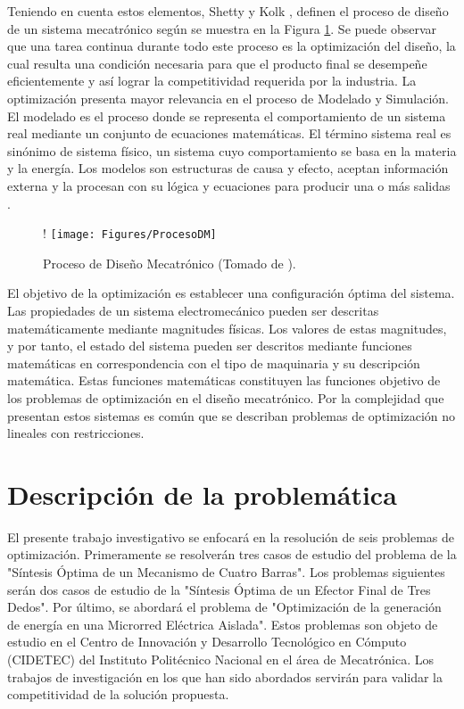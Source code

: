  Teniendo en cuenta estos elementos, Shetty y Kolk \cite{shetty_mechatronics_2010}, definen el proceso de diseño de un sistema mecatrónico según se muestra en la Figura \ref{DMecatronico}. Se puede observar que una tarea continua durante todo este proceso es la optimización del diseño, la cual resulta una condición necesaria para que el producto final se desempeñe eficientemente y así lograr la competitividad requerida por la industria. La optimización presenta mayor relevancia en el proceso de Modelado y Simulación. El modelado es el proceso  donde se representa el comportamiento de un sistema real mediante un conjunto de  ecuaciones matemáticas. El término sistema real es sinónimo de sistema físico, un sistema cuyo comportamiento se basa en la materia y la energía. Los modelos son estructuras de causa y efecto, aceptan información externa y la procesan con su lógica y ecuaciones para producir una o más salidas \cite{fritzson_basic_2011}.
	
	\begin{figure}[htb]
		\begin{center}
		 \resizebox {\textwidth} {!} {	
			\texttt{[image: Figures/ProcesoDM]}
		}
			\caption[Proceso de Diseño Mecatrónico]{Proceso de Diseño Mecatrónico (Tomado de \cite{shetty_mechatronics_2010}).}
			\label{DMecatronico}
		\end{center}
	\end{figure}


 El objetivo de la optimización es establecer una configuración óptima del sistema. Las propiedades de un sistema electromecánico pueden ser descritas matemáticamente mediante magnitudes físicas. Los valores de estas magnitudes, y por tanto, el estado del sistema pueden ser descritos mediante funciones matemáticas en correspondencia con el tipo de maquinaria y su descripción matemática.  Estas funciones matemáticas constituyen las funciones objetivo de los problemas de optimización en el diseño mecatrónico. Por la complejidad que presentan estos sistemas es común que se describan problemas de optimización no lineales con  restricciones.

 \section{Descripción de la problemática}
  El presente trabajo investigativo se enfocará en la resolución de seis problemas de optimización. Primeramente se resolverán tres casos de estudio del problema de la "Síntesis Óptima de un Mecanismo de Cuatro Barras". Los problemas siguientes serán dos casos de estudio de la "Síntesis Óptima de un Efector Final de Tres Dedos". Por último, se abordará el problema de "{Optimización de la generación de energía en una Microrred Eléctrica Aislada}". Estos problemas son objeto de estudio en el Centro de Innovación y Desarrollo Tecnológico  en Cómputo (CIDETEC) del Instituto Politécnico Nacional en el área de Mecatrónica. Los trabajos de investigación en los que han sido abordados servirán para validar la competitividad de la solución propuesta. 


